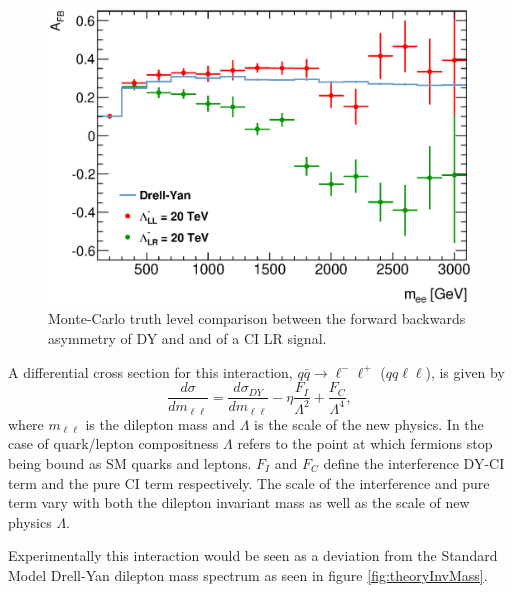         \begin{figure}[h]
            \begin{center}
            \includegraphics[width=0.9\linewidth]{images/AFB_MC.eps}
            \end{center}
            \caption{Monte-Carlo truth level comparison between the forward backwards asymmetry of DY and and of a CI LR signal.}
            \label{fig:theoryAFB}
        \end{figure}

        A differential cross section for this interaction, $q\bar{q} \rightarrow \ell^{-}\ell^{+}$ ($qq\ell\ell$), is given by
        \begin{equation}
            \frac{d\sigma}{dm_{\ell\ell}} = 
                \frac{d\sigma_{DY}}{dm_{\ell\ell}} 
                - \eta\frac{F_{I}}{\Lambda^{2}} 
                + \frac{F_{C}}{\Lambda^{4}},
            \label{eq:DiffCross}
        \end{equation}
        where $m_{\ell\ell}$ is the dilepton mass and $\Lambda$ is the scale of the new physics. In the case of quark/lepton compositness $\Lambda$ refers to the point at which fermions stop being bound as SM quarks and leptons. $F_{I}$ and $F_{C}$ define the interference DY-CI term and the pure CI term respectively. The scale of the interference and pure term vary with both the dilepton invariant mass as well as the scale of new physics $\Lambda$.

        Experimentally this interaction would be seen as a deviation from the Standard Model Drell-Yan dilepton mass spectrum as seen in figure \ref{fig:theoryInvMass}. 

